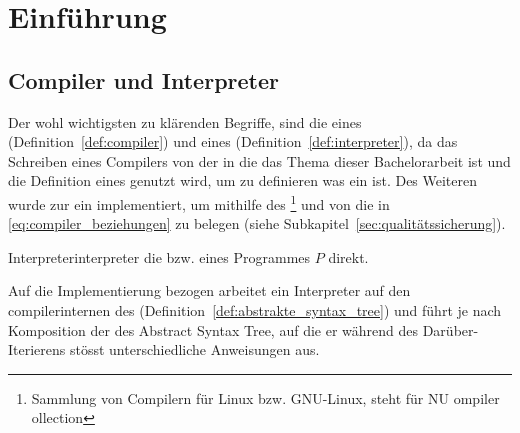 \chapter{Einführung}
\label{ch:einführung}

\section{Compiler und Interpreter}
Der wohl wichtigsten zu klärenden Begriffe, sind die eines  (Definition~\ref{def:compiler}) und eines   (Definition~\ref{def:interpreter}), da das Schreiben eines Compilers von der  in die  das Thema dieser Bachelorarbeit ist und die Definition eines  genutzt wird, um zu definieren was ein  ist. Des Weiteren wurde zur  ein  implementiert, um mithilfe des \footnote{Sammlung von Compilern für Linux bzw. GNU-Linux, steht für NU ompiler ollection} und von  die  in \ref{eq:compiler_beziehungen} zu belegen (siehe Subkapitel~\ref{sec:qualitätssicherung}).

\begin{Definition}{Interpreter}{interpreter}
   die  bzw.  eines Programmes $P$ direkt.

  Auf die Implementierung bezogen arbeitet ein Interpreter auf den compilerinternen  des  (Definition~\ref{def:abstrakte_syntax_tree}) und führt je nach Komposition der  des Abstract Syntax Tree, auf die er während des Darüber-Iterierens stösst unterschiedliche Anweisungen aus.
\end{Definition}

